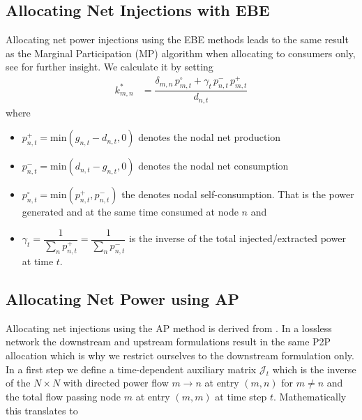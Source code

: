 \documentclass[11pt,twocolumn]{article}
\newcommand{\nodalgeneration}[1][n]{g_{#1,t}}
\newcommand{\nodaldemand}[1][n]{d_{#1,t}}
\newcommand{\Slackk}{k^*_{m,n}}
\newcommand{\injection}{p_{n,t}}
\newcommand{\netconsumption}[1][n]{p^{-}_{#1,t}}
\newcommand{\netproduction}[1][n]{p^{+}_{#1,t}}
\newcommand{\selfconsumption}[1][n]{p^{\circ}_{#1,t}}
\newcommand{\InverseAPInjection}{\mathcal{J}}
\begin{document}
\subsection{Allocating Net Injections with EBE}
\label{sec:net_ebe}

Allocating net power injections using the EBE methods leads to the same result as the Marginal Participation (MP) \cite{rudnick_marginal_1995}  algorithm when allocating to consumers only, see \cite{hofmann_flow_2020-1} for further insight. We calculate it by setting 
\begin{align}
\Slackk &= \dfrac{ \delta_{m,n}\,\selfconsumption[m] + \gamma_t \, \netconsumption  \, \netproduction[m]}{\nodaldemand}
\label{eq:mp_slack}
\end{align}
where 
\begin{itemize}
\item $\netproduction = \text{min}\left( \nodalgeneration - \nodaldemand , 0 \right) $ denotes the nodal net production 
\item $\netconsumption = \text{min}\left( \nodaldemand  - \nodalgeneration, 0 \right)$ denotes the nodal net consumption
\item $\selfconsumption = \text{min}\left( \netproduction, \netconsumption \right)$ the denotes  nodal self-consumption. That is the power generated and at the same time consumed at node $n$ and 
\item $\gamma_t = \dfrac{1}{\sum_n \netproduction} = \dfrac{1}{\sum_n \netconsumption}$ is the inverse of the total injected/extracted power at time $t$.
\end{itemize}

\subsection{Allocating Net Power using AP}
\label{sec:net_ap}

Allocating net injections using the AP method is derived from \cite{achayuthakan_electricity_2010-1}. In a lossless network the downstream and upstream formulations result in the same P2P allocation which is why we restrict ourselves to the downstream formulation only. In a first step we define a time-dependent auxiliary matrix $\InverseAPInjection_t$ which is the inverse of the $N\times N$ with directed power flow $m \rightarrow n$ at entry $(m, n)$ for $m \ne n$ and the total flow passing node $m$ at entry $\left( m, m\right)$ at time step $t$. Mathematically this translates to
\end{document}
